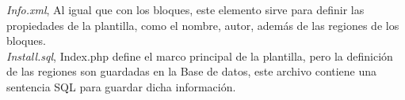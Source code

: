 \emph{Info.xml}, Al igual que con los bloques, este elemento sirve para definir las propiedades de la plantilla, como el nombre, autor, adem\'as de las regiones de los bloques.\\



\emph{Install.sql}, Index.php define el marco principal de la plantilla, pero la definici\'on de las regiones son guardadas en la Base de datos, este archivo contiene una sentencia SQL para guardar dicha informaci\'on.\\



\clearpage

